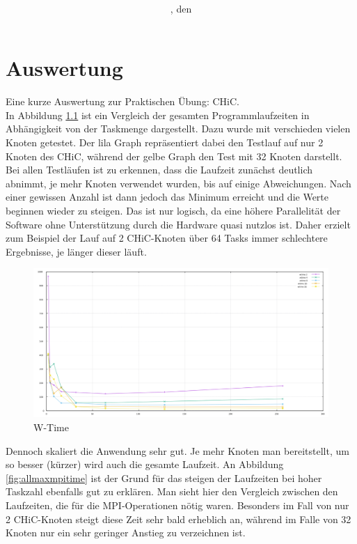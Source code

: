 \documentclass[
	12pt,			%
	a4paper,		%
	twoside,		%
	german,			%
	headsepline,		%
	footnosepline=true,		%
	automark,		%
	smallheadings,		%
	appendixprefix,		%
	openright,		%
	cleardoubleempty,	%
	abstracton,		%
	index=totoc,		%
	listof=totoc,		%
	bibliography=totoc,		%
 	BCOR8mm,		%
]{scrreprt}
\title{\sf\Large
	\dctitle
	\\
	\dcsubtitle
}
\author{\dcauthorfirstname~\dcauthorlastname}
\date{\dcplace, den \dcdate
}
\begin{document}
\maketitle
	
\chapter{Auswertung}

Eine kurze Auswertung zur Praktischen Übung: CHiC.\\
In Abbildung \ref{fig:allmaxwtime} ist ein Vergleich der gesamten Programmlaufzeiten in Abhängigkeit von der Taskmenge dargestellt. Dazu wurde mit verschieden vielen Knoten getestet. Der lila Graph repräsentiert dabei den Testlauf auf nur 2 Knoten des CHiC, während der gelbe Graph den Test mit 32 Knoten darstellt. Bei allen Testläufen ist zu erkennen, dass die Laufzeit zunächst deutlich abnimmt, je mehr Knoten verwendet wurden, bis auf einige Abweichungen. Nach einer gewissen Anzahl ist dann jedoch das Minimum erreicht und die Werte beginnen wieder zu steigen. Das ist nur logisch, da eine höhere Parallelität der Software ohne Unterstützung durch die Hardware quasi nutzlos ist. Daher erzielt zum Beispiel der Lauf auf 2 CHiC-Knoten über 64 Tasks immer schlechtere Ergebnisse, je länger dieser läuft.	
\begin{figure}[htbp]
\begin{center}
\caption{W-Time}
\label{fig:allmaxwtime}
\includegraphics[width=\textwidth]{all_maxwtime}
\end{center}
\end{figure}
Dennoch skaliert die Anwendung sehr gut. Je mehr Knoten man bereitstellt, um so besser (kürzer) wird auch die gesamte Laufzeit. An Abbildung \ref{fig:allmaxmpitime} ist der Grund für das steigen der Laufzeiten bei hoher Taskzahl ebenfalls gut zu erklären. Man sieht hier den Vergleich zwischen den Laufzeiten, die für die MPI-Operationen nötig waren. Besonders im Fall von nur 2 CHiC-Knoten steigt diese Zeit sehr bald erheblich an, während im Falle von 32 Knoten nur ein sehr geringer Anstieg zu verzeichnen ist.
\end{document}
